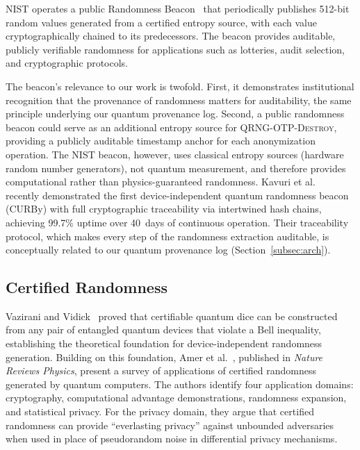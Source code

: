 \documentclass[journal]{IEEEtran}
\begin{document}
NIST operates a public Randomness Beacon~\cite{nist2023beacon} that periodically publishes 512-bit random values generated from a certified entropy source, with each value cryptographically chained to its predecessors. The beacon provides auditable, publicly verifiable randomness for applications such as lotteries, audit selection, and cryptographic protocols.

The beacon's relevance to our work is twofold. First, it demonstrates institutional recognition that the provenance of randomness matters for auditability, the same principle underlying our quantum provenance log. Second, a public randomness beacon could serve as an additional entropy source for \textsc{QRNG-OTP-Destroy}, providing a publicly auditable timestamp anchor for each anonymization operation. The NIST beacon, however, uses classical entropy sources (hardware random number generators), not quantum measurement, and therefore provides computational rather than physics-guaranteed randomness. Kavuri et al.~\cite{kavuri2025traceable} recently demonstrated the first device-independent quantum randomness beacon (CURBy) with full cryptographic traceability via intertwined hash chains, achieving 99.7\% uptime over 40~days of continuous operation. Their traceability protocol, which makes every step of the randomness extraction auditable, is conceptually related to our quantum provenance log (Section~\ref{subsec:arch}).

\subsection{Certified Randomness}
\label{subsec:certified}

Vazirani and Vidick~\cite{vazirani2012certifiable} proved that certifiable quantum dice can be constructed from any pair of entangled quantum devices that violate a Bell inequality, establishing the theoretical foundation for device-independent randomness generation. Building on this foundation, Amer et al.~\cite{amer2025certified}, published in \emph{Nature Reviews Physics}, present a survey of applications of certified randomness generated by quantum computers. The authors identify four application domains: cryptography, computational advantage demonstrations, randomness expansion, and statistical privacy. For the privacy domain, they argue that certified randomness can provide ``everlasting privacy'' against unbounded adversaries when used in place of pseudorandom noise in differential privacy mechanisms.
\end{document}
